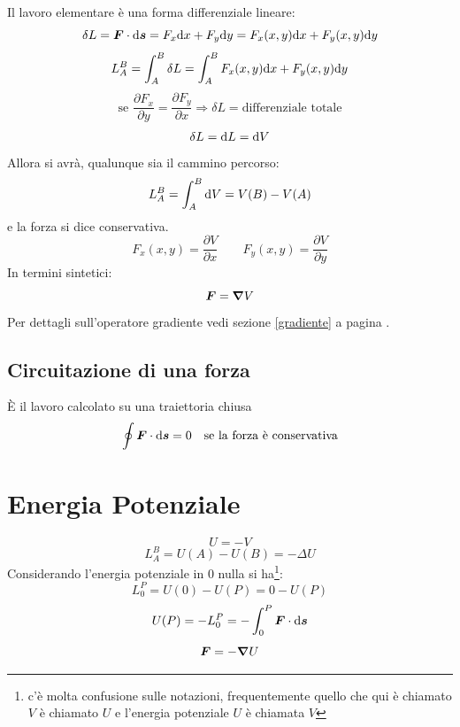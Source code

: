 Il lavoro elementare è una forma differenziale lineare:
\begin{equation*}\delta L=\boldsymbol{F}\cdot \mathrm{d} \boldsymbol{s}=F_x\mathrm{d} x+F_y\mathrm{d} y=F_x(x,y)\mathrm{d} x+F_y(x,y)\mathrm{d} y\end{equation*}
\begin{equation*}L_A^B=\int_A^B\delta L=\int_A^B F_x(x,y)\mathrm{d} x+F_y(x,y)\mathrm{d} y\end{equation*}
\begin{equation*}\text{se } \frac{\partial F_x}{\partial y}=\frac{\partial F_y}{\partial x} \Rightarrow \delta L= \text{differenziale totale}\end{equation*}
\begin{equation*}\delta L=\mathrm{d} L=\mathrm{d} V\end{equation*}
Allora si avrà, qualunque sia il cammino percorso:
\begin{equation*}L_A^B=\int_A^B \mathrm{d} V=V(B)-V(A)\end{equation*}
e la forza si dice conservativa.
\begin{equation*}F_x(x,y)=\frac{\partial V}{\partial x}\qquad F_y(x,y)=\frac{\partial V}{\partial y}\end{equation*}
In termini sintetici:
 \begin{equation*}\boldsymbol{F}=\boldsymbol{\nabla} V\end{equation*}
 Per dettagli sull'operatore
gradiente vedi sezione \ref{gradiente} a pagina
\pageref{gradiente}.

\subsection{Circuitazione di una forza}
\`E il lavoro calcolato su una traiettoria chiusa
\begin{equation*}\oint \boldsymbol{F}\cdot\mathrm{d} \boldsymbol{s}=0 \quad \text{se la forza è conservativa}\end{equation*}

\section{Energia Potenziale}
\begin{equation*}U=-V\end{equation*}
\begin{equation*}L_A^B=U(A)-U(B)=-\Delta U\end{equation*}
Considerando l'energia potenziale in $0$ nulla si ha\footnote{c'è molta confusione sulle notazioni, frequentemente quello che qui è chiamato $V$ è chiamato $U$ e l'energia potenziale $U$ è chiamata $V$}:
\begin{equation*}L_0^P=U(0)-U(P)=0-U(P)\end{equation*}
\begin{equation*}U(P)=-L_0^P=-\int_0^P \boldsymbol{F}\cdot\mathrm{d} \boldsymbol{s}\end{equation*}
\begin{equation*}\boldsymbol{F}=-\boldsymbol{\nabla} U\end{equation*}

